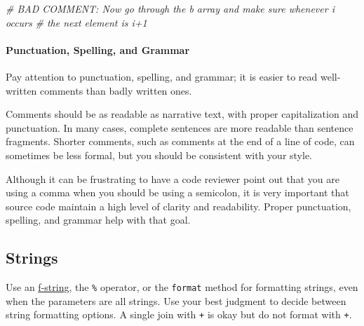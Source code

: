 \documentclass[
]{article}
\newenvironment{Shaded}{}{}
\newcommand{\CommentTok}[1]{\textcolor[rgb]{0.38,0.63,0.69}{\textit{#1}}}
\begin{document}
\begin{samepage}
\begin{Shaded}
\begin{Highlighting}[]
\CommentTok{\# BAD COMMENT: Now go through the b array and make sure whenever i occurs}
\CommentTok{\# the next element is i+1}
\end{Highlighting}
\end{Shaded}
\end{samepage}

\paragraph{Punctuation, Spelling, and Grammar}

Pay attention to punctuation, spelling, and grammar; it is easier to
read well-written comments than badly written ones.

Comments should be as readable as narrative text, with proper
capitalization and punctuation. In many cases, complete sentences are
more readable than sentence fragments. Shorter comments, such as
comments at the end of a line of code, can sometimes be less formal, but
you should be consistent with your style.

Although it can be frustrating to have a code reviewer point out that
you are using a comma when you should be using a semicolon, it is very
important that source code maintain a high level of clarity and
readability. Proper punctuation, spelling, and grammar help with that
goal.

\subsection{Strings}

Use an
\href{https://docs.python.org/3/reference/lexical_analysis.html\#f-strings}{f-string},
the \texttt{\%} operator, or the \texttt{format} method for formatting
strings, even when the parameters are all strings. Use your best
judgment to decide between string formatting options. A single join with
\texttt{+} is okay but do not format with \texttt{+}.
\end{document}
